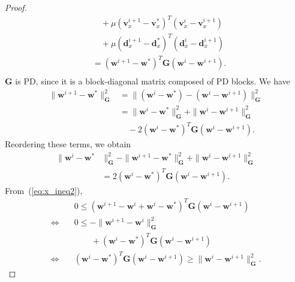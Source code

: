 \documentclass[10pt,twocolumn,twoside]{IEEEtran}
\newcommand{\z}{\mathbf{z}} %
\newcommand{\vs}{\mathbf{v}} %
\newcommand{\dv}{\mathbf{d}} %
\newcommand{\wt}{\mathbf{w}} %
\newcommand{\C}{\mathbf{C}} %
\newcommand{\G}{\mathbf{G}} %
\begin{document}
\begin{proof}
\begin{equation}
\begin{aligned}
	& \quad + \mu (\vs_x^{i+1} - \vs_x^*)^T (\vs_x^i - \vs_x^{i+1})\\
	& \quad + \mu (\dv_x^{i+1} - \dv_x^*)^T (\dv_x^i - \dv_x^{i+1})\\
	& = (\wt^{i+1} - \wt^*)^T \G (\wt^i - \wt^{i+1}). \\
	\end{aligned}
	\end{equation}
	$\G$ is PD, since it is a block-diagonal matrix composed of PD blocks. We have
	\begin{equation}
	\begin{aligned}
	\|\wt^{i+1} - \wt^*\|^2_{\G} &= \|(\wt^i - \wt^*) - (\wt^i - \wt^{i+1})\|^2_{\G}\\
	& = \|\wt^i - \wt^*\|^2_{\G} + \|\wt^i - \wt^{i+1}\|^2_{\G} \\
	& \quad - 2 (\wt^i - \wt^*)^T \G (\wt^i - \wt^{i+1}).
	\end{aligned}
	\end{equation}
	Reordering these terms, we obtain
	\begin{equation} \label{eq:reordering}
	\begin{aligned}
	\|\wt^i - \wt^*&\|^2_{\G} - \|\wt^{i+1}- \wt^*\|^2_{\G} +  \|\wt^i - \wt^{i+1}\|^2_{\G} \\
	& = 2 (\wt^i - \wt^*)^T \G (\wt^i - \wt^{i+1}).
	\end{aligned}
	\end{equation}
	From~(\ref{eq:x_ineq2}),
	\begin{align}
	&0 \leq (\wt^{i+1} - \wt^i + \wt^i - \wt^*)^T \G (\wt^i - \wt^{i+1}) \nonumber \\
	\Leftrightarrow \quad &0 \leq - \|\wt^{i+1} - \wt^i\|^2_{\G} \nonumber \\
	&\qquad + (\wt^i - \wt^*)^T \G (\wt^i - \wt^{i+1}) \nonumber \\
	\Leftrightarrow \quad &(\wt^i - \wt^*)^T \G (\wt^i - \wt^{i+1}) \geq  \|\wt^i - \wt^{i+1}\|^2_{\G}. \label{eq:ineq3}

\end{align}
\end{proof}
\end{document}
